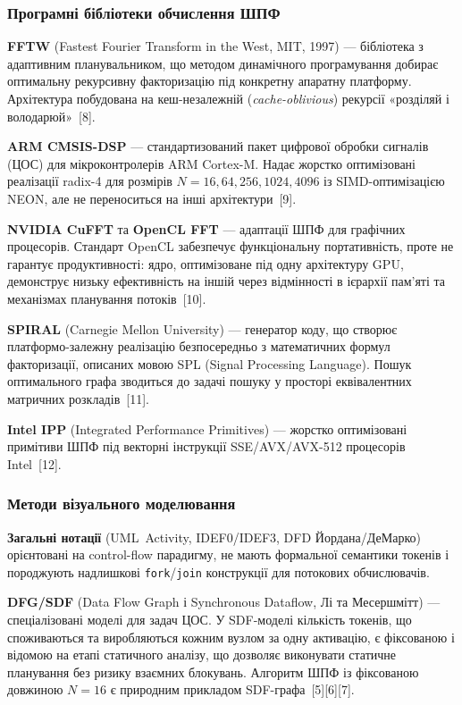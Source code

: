 \documentclass[14pt,a4paper]{extarticle}
\begin{document}
\subsubsection*{Програмні бібліотеки обчислення ШПФ}

\textbf{FFTW} (Fastest Fourier Transform in the West, MIT, 1997) ---
бібліотека з адаптивним планувальником, що методом динамічного
програмування добирає оптимальну рекурсивну факторизацію під
конкретну апаратну платформу. Архітектура побудована на
кеш-незалежній (\textit{cache-oblivious}) рекурсії «розділяй і
володарюй»~[8].

\textbf{ARM CMSIS-DSP} --- стандартизований пакет цифрової обробки
сигналів (ЦОС) для мікроконтролерів ARM Cortex-M. Надає жорстко
оптимізовані реалізації radix-4 для розмірів $N = 16, 64, 256, 1024,
4096$ із SIMD-оптимізацією NEON, але не переноситься на інші
архітектури~[9].

\textbf{NVIDIA CuFFT} та \textbf{OpenCL FFT} --- адаптації ШПФ для
графічних процесорів. Стандарт OpenCL забезпечує функціональну
портативність, проте не гарантує продуктивності: ядро, оптимізоване
під одну архітектуру GPU, демонструє низьку ефективність на іншій
через відмінності в ієрархії пам'яті та механізмах планування
потоків~[10].

\textbf{SPIRAL} (Carnegie Mellon University) --- генератор коду,
що створює платформо-залежну реалізацію безпосередньо з математичних
формул факторизації, описаних мовою SPL (Signal Processing Language).
Пошук оптимального графа зводиться до задачі пошуку у просторі
еквівалентних матричних розкладів~[11].

\textbf{Intel IPP} (Integrated Performance Primitives) --- жорстко
оптимізовані примітиви ШПФ під векторні інструкції SSE/AVX/AVX-512
процесорів Intel~[12].

\subsubsection*{Методи візуального моделювання}

\textbf{Загальні нотації} (UML~Activity, IDEF0/IDEF3, DFD
Йордана/ДеМарко) орієнтовані на control-flow парадигму, не мають
формальної семантики токенів і породжують надлишкові
\texttt{fork}/\texttt{join} конструкції для потокових обчислювачів.

\textbf{DFG/SDF} (Data Flow Graph і Synchronous Dataflow,
Лі та Месершмітт) --- спеціалізовані моделі для задач ЦОС.
У SDF-моделі кількість токенів, що споживаються та виробляються
кожним вузлом за одну активацію, є фіксованою і відомою на етапі
статичного аналізу, що дозволяє виконувати статичне планування без
ризику взаємних блокувань. Алгоритм ШПФ із фіксованою довжиною
$N = 16$ є природним прикладом SDF-графа~[5][6][7].
\end{document}
